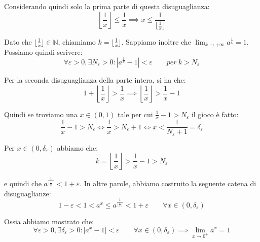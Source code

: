 \documentclass{article}
\begin{document}
\noindent Considerando quindi solo la prima parte di questa disuguaglianza:
\begin{equation*}
    \left\lfloor \frac{1}{x} \right\rfloor \leq \frac{1}{x} \implies x \leq \frac{1}{\lfloor \frac{1}{x} \rfloor}
\end{equation*}

\noindent Dato che $\lfloor \frac{1}{x} \rfloor \in \mathbb{N}$, chiamiamo $k = \lfloor \frac{1}{x} \rfloor$. Sappiamo inoltre che $\lim_{k \to +\infty} a^\frac{1}{k} = 1$. Possiamo quindi scrivere:
\begin{equation*}
    \forall \varepsilon > 0, \exists N_\varepsilon > 0 : |a^\frac{1}{k} - 1| < \varepsilon \qquad per \ k > N_\varepsilon
\end{equation*}

\noindent Per la seconda disuguaglianza della parte intera, si ha che:
\begin{equation*}
    1 + \left\lfloor \frac{1}{x} \right\rfloor > \frac{1}{x} \implies \left\lfloor \frac{1}{x} \right\rfloor > \frac{1}{x} - 1
\end{equation*}

\noindent Quindi se troviamo una $x \in (0, 1)$ tale per cui $\frac{1}{x} - 1 > N_\varepsilon$ il gioco è fatto:
\begin{equation*}
    \frac{1}{x} - 1 > N_\varepsilon \iff \frac{1}{x} > N_\varepsilon + 1 \iff x < \frac{1}{N_\varepsilon + 1} = \delta_\varepsilon
\end{equation*}

\noindent Per $x \in (0, \delta_\varepsilon)$ abbiamo che:
\begin{equation*}
    k = \left\lfloor \frac{1}{x} \right\rfloor > \frac{1}{x} - 1 > N_\varepsilon
\end{equation*}

\noindent e quindi che $a^\frac{1}{\lfloor\frac{1}{x}\rfloor} < 1 + \varepsilon$. In altre parole, abbiamo costruito la seguente catena di disuguaglianze:
\begin{equation*}
    1 - \varepsilon < 1 < a^x \leq a^\frac{1}{\lfloor \frac{1}{x} \rfloor} < 1 + \varepsilon \qquad \forall x \in (0, \delta_\varepsilon)
\end{equation*}

\noindent Ossia abbiamo mostrato che:
\begin{equation*}
    \forall \varepsilon > 0, \exists \delta_\varepsilon > 0 : |a^x - 1| < \varepsilon \qquad \forall x \in (0, \delta_\varepsilon) \implies \lim_{x \to 0^+} a^x = 1
\end{equation*}
\end{document}
